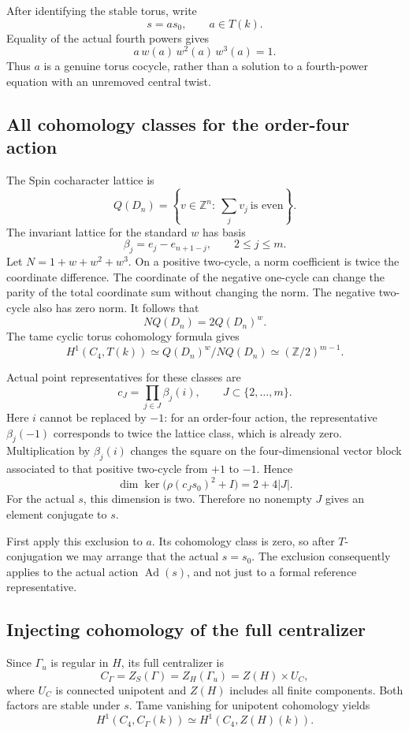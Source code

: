 \documentclass[11pt,a4paper]{article}
\theoremstyle{definition}
\theoremstyle{remark}
\begin{document}
After identifying the stable torus, write
\[
s=a s_0,\qquad a\in T(k).
\]
Equality of the actual fourth powers gives
\[
a\,w(a)\,w^2(a)\,w^3(a)=1.
\]
Thus \(a\) is a genuine torus cocycle, rather than a solution to a
fourth-power equation with an unremoved central twist.

\subsection{All cohomology classes for the order-four action}

The Spin cocharacter lattice is
\[
Q(D_n)=
\left\{v\in\mathbb Z^n:\ \sum_j v_j\ \text{is even}\right\}.
\]
The invariant lattice for the standard \(w\) has basis
\[
\beta_j=e_j-e_{n+1-j},\qquad 2\leq j\leq m.
\]
Let \(N=1+w+w^2+w^3\).
On a positive two-cycle, a norm coefficient is twice the coordinate
difference.  The coordinate of the negative one-cycle can change the
parity of the total coordinate sum without changing the norm.
The negative two-cycle also has zero norm.
It follows that
\[
NQ(D_n)=2Q(D_n)^w.
\]
The tame cyclic torus cohomology formula gives
\[
H^1(C_4,T(k))
\simeq Q(D_n)^w/NQ(D_n)
\simeq(\mathbb Z/2)^{m-1}.
\]

Actual point representatives for these classes are
\[
c_J=\prod_{j\in J}\beta_j(i),
\qquad J\subset\{2,\ldots,m\}.
\]
Here \(i\) cannot be replaced by \(-1\):
for an order-four action, the representative \(\beta_j(-1)\)
corresponds to twice the lattice class, which is already zero.
Multiplication by \(\beta_j(i)\) changes the square on the
four-dimensional vector block associated to that positive two-cycle
from \(+1\) to \(-1\).  Hence
\[
\dim\ker\bigl(\rho(c_Js_0)^2+I\bigr)=2+4|J|.
\]
For the actual \(s\), this dimension is two.
Therefore no nonempty \(J\) gives an element conjugate to \(s\).

First apply this exclusion to \(a\).
Its cohomology class is zero, so after \(T\)-conjugation we may arrange
that the actual \(s=s_0\).
The exclusion consequently applies to the actual action
\(\operatorname{Ad}(s)\), and not just to a formal reference
representative.

\subsection{Injecting cohomology of the full centralizer}

Since \(\Gamma_u\) is regular in \(H\), its full centralizer is
\[
C_\Gamma=Z_S(\Gamma)=Z_H(\Gamma_u)=Z(H)\times U_C,
\]
where \(U_C\) is connected unipotent and \(Z(H)\) includes all finite
components.  Both factors are stable under \(s\).
Tame vanishing for unipotent cohomology yields
\[
H^1(C_4,C_\Gamma(k))
\simeq H^1(C_4,Z(H)(k)).
\]
\end{document}
